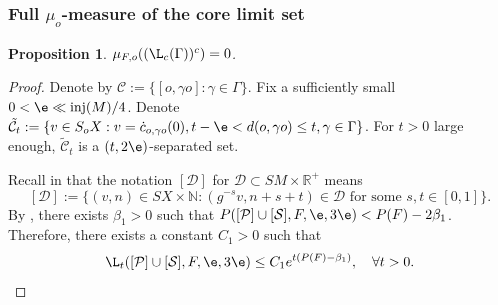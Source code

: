 \documentclass[11pt]{amsart}
\newtheorem{proposition}[theorem]{Proposition}
\theoremstyle{definition}
\newcommand{\CCC}{\mathcal{C}}
\newcommand{\DDD}{\mathcal{D}}
\newcommand{\PPP}{\mathcal{P}}
\newcommand{\SSS}{\mathcal{S}}
\newcommand{\CC}{\mathbb{C}}
\def\CC{{\mathcal C}}
\def\RR{{\mathbb R}}
\def\NN{{\mathbb N}}
\def\inj{{\text{inj}}}
\def\b{\beta}
\def\c{\gamma}   \def\C{\Gamma}
\begin{document}
\subsubsection{Full $\mu_o$-measure of the core limit set}
\begin{proposition}\label{full}
    $\mu_{F,o}((\L_c(\C))^c)=0$.
\end{proposition}
\begin{proof}
Denote by $\CCC:=\{[o,\c o]: \c\in \C\}$. Fix a sufficiently small $0<\e\ll \inj(M)/4$. Denote $\tilde{\CC}_t:=\{v\in S_oX: v=\dot c_{o,\c o}(0), t-\e<d(o,\c o)\le t, \c\in \C\}$. For $t>0$ large enough, $\tilde\CC_t$ is a $(t,2\e)$-separated set. 

Recall in \cite{CT16} that the notation $[\DDD]$ for $\DDD\subset SM\times \RR^+$ means
$$[\DDD]:=\{(v,n)\in SX\times \NN: (g^{-s}v, n+s+t)\in \DDD \text{\ for some\ }s,t\in [0,1]\}.$$
By \cite[Proposition 5.2]{BCFT}, there exists $\b_1>0$ such that
$P([\PPP]\cup[\SSS], F, \e, 3\e)<P(F)-2\b_1$. Therefore, there exists a constant $C_1>0$ such that
$$\L_t([\PPP]\cup[\SSS], F, \e, 3\e)\le C_1e^{t(P(F)-\b_1)}, \quad \forall t>0.$$



\end{proof}
\end{document}
